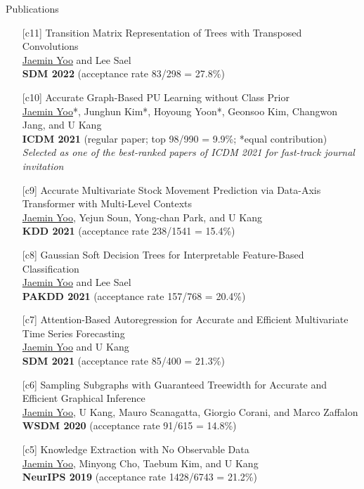 \documentclass{resume} %
\begin{document}
\begin{rSection}{Publications}
\begin{enumerate}
	\item[{[c11]}]
		Transition Matrix Representation of Trees with Transposed Convolutions \\
		\underline{Jaemin Yoo} and Lee Sael \\
		\textbf{SDM 2022} (acceptance rate 83/298 = 27.8\%) \\

	\item[{[c10]}]
		Accurate Graph-Based PU Learning without Class Prior \\
		\underline{Jaemin Yoo}*, Junghun Kim*, Hoyoung Yoon*, Geonsoo Kim, Changwon Jang, and U Kang \\
		\textbf{ICDM 2021} (regular paper; top 98/990 = 9.9\%; *equal contribution) \\
		\emph{Selected as one of the best-ranked papers of ICDM 2021 for fast-track journal invitation}

	\item[{[c9]}]
		Accurate Multivariate Stock Movement Prediction via Data-Axis Transformer with Multi-Level Contexts  \\
		\underline{Jaemin Yoo}, Yejun Soun, Yong-chan Park, and U Kang \\
		\textbf{KDD 2021} (acceptance rate 238/1541 = 15.4\%)

	\item[{[c8]}]
		Gaussian Soft Decision Trees for Interpretable Feature-Based Classification \\
		\underline{Jaemin Yoo} and Lee Sael \\
		\textbf{PAKDD 2021} (acceptance rate 157/768 = 20.4\%)
		
	\item[{[c7]}]
		Attention-Based Autoregression for Accurate and Efficient Multivariate Time Series Forecasting \\
		\underline{Jaemin Yoo} and U Kang \\
		\textbf{SDM 2021} (acceptance rate 85/400 = 21.3\%)

	\item[{[c6]}]
		Sampling Subgraphs with Guaranteed Treewidth for Accurate and Efficient Graphical Inference \\
		\underline{Jaemin Yoo}, U Kang, Mauro Scanagatta, Giorgio Corani, and Marco Zaffalon \\
		\textbf{WSDM 2020} (acceptance rate 91/615 = 14.8\%)

	\item[{[c5]}]
		Knowledge Extraction with No Observable Data \\
		\underline{Jaemin Yoo}, Minyong Cho, Taebum Kim, and U Kang \\
		\textbf{NeurIPS 2019} (acceptance rate 1428/6743 = 21.2\%)


\end{enumerate}
\end{rSection}
\end{document}
